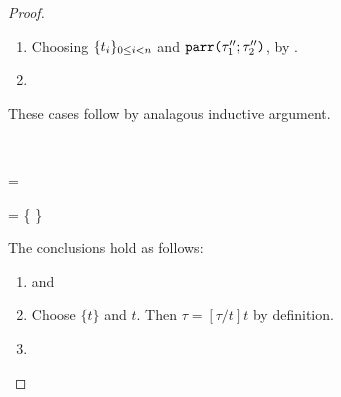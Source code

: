\begin{proof}
\begin{byCases}
\begin{enumerate}
      \item Choosing $\{t_i\}_{0 \leq i < n}$ and $\texttt{parr}\texttt{(}\tau''_1; \tau''_2\texttt{)}$, by .
      \item {}
    \end{enumerate}
    \resetpfcounter
  \item[\text{(\ref{rule:cvalidT-U-all}) \textbf{through} (\ref{rule:cvalidT-U-sum})}] These cases follow by analagous inductive argument.
  \item[\text{(\ref{rule:cvalidT-U-splicedt})}] ~
  \begin{pfsteps}
  \item \ctau =  
  \item {} = \{  \} 
  \item {}  
  \item {}  
  \item {}  
  \end{pfsteps}
  The conclusions hold as follows:
  \begin{enumerate}
    \item {} and 
    \item Choose $\{t\}$ and $t$. Then $\tau = [\tau/t]t$ by definition.
    \item {}
  \end{enumerate}
  \resetpfcounter
\end{byCases}
\end{proof}

